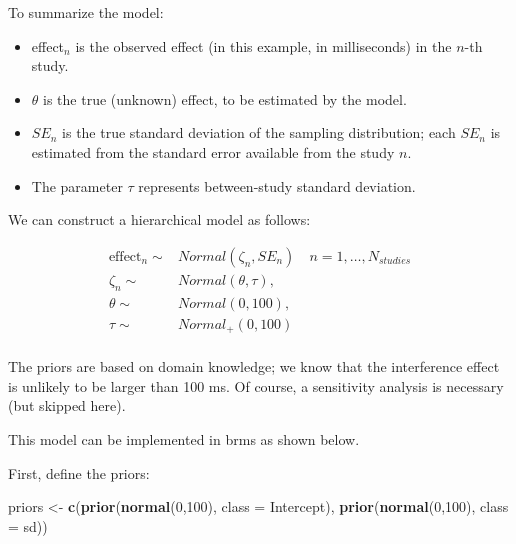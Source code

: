 \documentclass[12pt,]{krantz}
\newenvironment{Shaded}{\begin{snugshade}}{\end{snugshade}}
\newcommand{\DataTypeTok}[1]{\textcolor[rgb]{0.13,0.29,0.53}{#1}}
\newcommand{\DecValTok}[1]{\textcolor[rgb]{0.00,0.00,0.81}{#1}}
\newcommand{\KeywordTok}[1]{\textcolor[rgb]{0.13,0.29,0.53}{\textbf{#1}}}
\newcommand{\NormalTok}[1]{#1}
\newcommand{\StringTok}[1]{\textcolor[rgb]{0.31,0.60,0.02}{#1}}
\providecommand{\tightlist}{%
  \setlength{\itemsep}{0pt}\setlength{\parskip}{0pt}}
\theoremstyle{definition}
\theoremstyle{definition}
\theoremstyle{definition}
\theoremstyle{remark}
\begin{document}
To summarize the model:

\begin{itemize}
\tightlist
\item
  effect\(_n\) is the observed effect (in this example, in milliseconds) in the \(n\)-th study.
\item
  \(\theta\) is the true (unknown) effect, to be estimated by the model.
\item
  \(SE_{n}\) is the true standard deviation of the sampling distribution; each \(SE_n\) is estimated from the standard error available from the study \(n\).
\item
  The parameter \(\tau\) represents between-study standard deviation.
\end{itemize}

We can construct a hierarchical model as follows:

\begin{equation}
\begin{split}
\text{effect}_n \sim & Normal(\zeta_n, SE_n) \quad n=1,\dots, N_{studies}\\
\zeta_n \sim & Normal(\theta, \tau), \\
\theta \sim & Normal(0,100),\\
 \tau \sim & Normal_+(0,100) \\
\end{split}
\end{equation}

The priors are based on domain knowledge; we know that the interference effect is unlikely to be larger than 100 ms. Of course, a sensitivity analysis is necessary (but skipped here).

This model can be implemented in brms as shown below.

First, define the priors:

\begin{Shaded}
\begin{Highlighting}[]
\NormalTok{priors <-}\StringTok{ }\KeywordTok{c}\NormalTok{(}\KeywordTok{prior}\NormalTok{(}\KeywordTok{normal}\NormalTok{(}\DecValTok{0}\NormalTok{,}\DecValTok{100}\NormalTok{), }\DataTypeTok{class =}\NormalTok{ Intercept),}
            \KeywordTok{prior}\NormalTok{(}\KeywordTok{normal}\NormalTok{(}\DecValTok{0}\NormalTok{,}\DecValTok{100}\NormalTok{), }\DataTypeTok{class =}\NormalTok{ sd))}
\end{Highlighting}
\end{Shaded}
\end{document}
